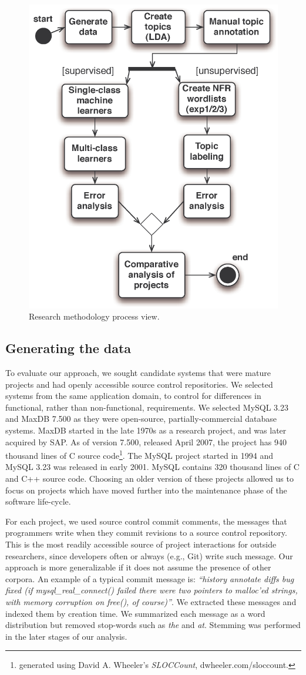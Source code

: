 \documentclass[]{sig-alternate}
\begin{document}
\begin{figure}
  \centering
 \includegraphics[width=.45\textwidth]{figures/process-model}
 \caption{Research methodology process view.}
  \label{fig:process}
\end{figure}

\subsection{Generating the data}
\label{sec:wordlist}

To evaluate our approach, we sought candidate systems that were mature projects and had openly accessible source control repositories. 
We selected systems from the same application domain, to control for differences in functional, rather than non-functional, requirements. 
We selected MySQL 3.23 and MaxDB 7.500 as they were open-source, partially-commercial database systems. 
MaxDB started in the late 1970s as a research project, and was later acquired by SAP. 
As of version 7.500, released April 2007, the project has 940 thousand lines of C source code\footnote{generated using David A. Wheeler's \emph{SLOCCount}, dwheeler.com/sloccount.}. 
The MySQL project started in 1994 and MySQL 3.23 was released in early 2001. 
MySQL contains 320 thousand lines of C and C++ source code.  
Choosing an older version of these projects allowed us to focus on projects which have moved further into the maintenance phase of the software life-cycle.

For each project, we used source control commit comments, the messages that programmers write when they commit revisions to a source control repository. 
This is the most readily accessible source of project interactions for outside researchers, since developers often or always (e.g., Git) write such message. Our approach is more generalizable if it does not assume the presence of other corpora. %
An example of a typical commit message is: \textit{``history annotate diffs bug fixed (if mysql\-\_real\-\_connect() failed there were two pointers to malloc'ed strings, with memory corruption on free(), of course)''}. 
We extracted these messages and indexed them by creation time. 
We summarized each message as a word distribution but removed stop-words such as \emph{the} and \emph{at}. 
Stemming was performed in the later stages of our analysis. %
\end{document}
